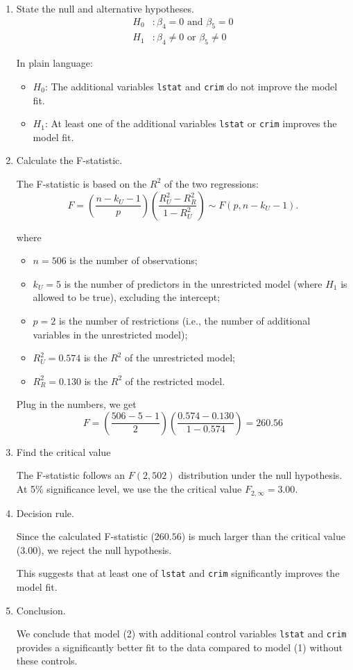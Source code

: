 \documentclass[
  12pt,
  letterpaper,
]{scrbook}
\providecommand{\tightlist}{%
  \setlength{\itemsep}{0pt}\setlength{\parskip}{0pt}}
\renewcommand{\tightlist}{\setlength{\itemsep}{0.5\baselineskip}\setlength{\parskip}{0.2\baselineskip}}
\theoremstyle{definition}
\theoremstyle{plain}
\theoremstyle{remark}
\begin{document}
\begin{enumerate}
\def\labelenumi{\arabic{enumi}.}
\item
  State the null and alternative hypotheses. \[
  \begin{aligned}
  H_0 &: \beta_4 = 0 \text{ and } \beta_5 = 0 \\
  H_1 &: \beta_4 \ne 0 \text{ or } \beta_5 \ne 0
  \end{aligned}
  \]

  In plain language:

  \begin{itemize}
  \tightlist
  \item
    \(H_0\): The additional variables \texttt{lstat} and \texttt{crim}
    do not improve the model fit.
  \item
    \(H_1\): At least one of the additional variables \texttt{lstat} or
    \texttt{crim} improves the model fit.
  \end{itemize}
\item
  Calculate the F-statistic.

  The F-statistic is based on the \(R^2\) of the two regressions: \[
  F = \left(\frac{n - k_U -1}{p}\right) \left(\frac{R_U^2-R_R^2}{1-R_U^2}\right) \sim F(p, n-k_U-1) .
  \]

  where

  \begin{itemize}
  \tightlist
  \item
    \(n = 506\) is the number of observations;
  \item
    \(k_U = 5\) is the number of predictors in the unrestricted model
    (where \(H_1\) is allowed to be true), excluding the intercept;
  \item
    \(p = 2\) is the number of restrictions (i.e., the number of
    additional variables in the unrestricted model);
  \item
    \(R_U^2 = 0.574\) is the \(R^2\) of the unrestricted model;
  \item
    \(R_R^2 = 0.130\) is the \(R^2\) of the restricted model.
  \end{itemize}

  Plug in the numbers, we get \[
  F = \left(\frac{506-5-1}{2}\right) \left(\frac{0.574-0.130}{1-0.574}\right) = 260.56
  \]
\item
  Find the critical value

  The F-statistic follows an \(F(2, 502)\) distribution under the null
  hypothesis. At 5\% significance level, we use the the critical value
  \(F_{2,\infty}=3.00.\)
\item
  Decision rule.

  Since the calculated F-statistic (\(260.56\)) is much larger than the
  critical value (\(3.00\)), we reject the null hypothesis.

  This suggests that at least one of \texttt{lstat} and \texttt{crim}
  significantly improves the model fit.
\item
  Conclusion.

  We conclude that model (2) with additional control variables
  \texttt{lstat} and \texttt{crim} provides a significantly better fit
  to the data compared to model (1) without these controls.
\end{enumerate}
\end{document}
